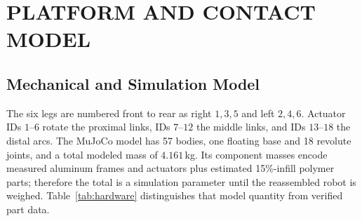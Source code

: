 \section{PLATFORM AND CONTACT MODEL}

\subsection{Mechanical and Simulation Model}

The six legs are numbered front to rear as right $1,3,5$ and left $2,4,6$.
Actuator IDs $1$--$6$ rotate the proximal links, IDs $7$--$12$ the middle links,
and IDs $13$--$18$ the distal arcs. The MuJoCo model has 57 bodies, one floating
base and 18 revolute joints, and a total modeled mass of $4.161\,$kg. Its
component masses encode measured aluminum frames and actuators plus estimated
15\%-infill polymer parts; therefore the total is a simulation parameter until
the reassembled robot is weighed. Table~\ref{tab:hardware} distinguishes that
model quantity from verified part data.

\begin{table}[t]
\caption{Actuation, contact and distal geometry used in simulation}
\label{tab:hardware}
\centering\footnotesize
{}
\end{table}

